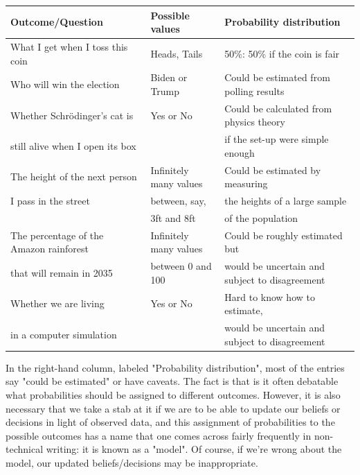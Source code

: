 \begin{table}[h!]
  \centering
  \begin{tabular}{|l|l|l|}
    \hline
    {\bf Outcome/Question}                  & {\bf Possible values} & {\bf Probability distribution} \\
    \hline
What I get when I toss this coin             & Heads, Tails & 50\%: 50\% if the coin is fair\\
    \hline
Who will win the election                     & Biden or Trump & Could be estimated from polling results\\
    \hline
Whether Schrödinger's cat is                 & Yes or No & Could be calculated from physics theory \\
still alive when I open its box                &              &  if the set-up were simple enough \\
    \hline
The height of the next person                & Infinitely many values & Could be estimated by measuring  \\
I pass in the street                               & between, say,  & the heights of a large sample  \\
                                                       & 3ft and 8ft & of the population \\
    \hline
The percentage of the Amazon rainforest & Infinitely many values & Could be roughly estimated but  \\
that will remain in 2035                       & between 0 and 100 & would be uncertain and subject to disagreement \\
    \hline
Whether we are living                          & Yes or No & Hard to know how to estimate,  \\
in a computer simulation                      &            & would be uncertain and subject to disagreement \\
    \hline
  \end{tabular}
\end{table}

In the right-hand column, labeled "Probability distribution", most of the entries say "could be estimated" or
have caveats. The fact is that is it often debatable what probabilities should be assigned to different
outcomes. However, it is also necessary that we take a stab at it if we are to be able to update our beliefs or
decisions in light of observed data, and this assignment of probabilities to the possible outcomes has a name
that one comes across fairly frequently in non-technical writing: it is known as a "model". Of course, if we're
wrong about the model, our updated beliefs/decisions may be inappropriate.


